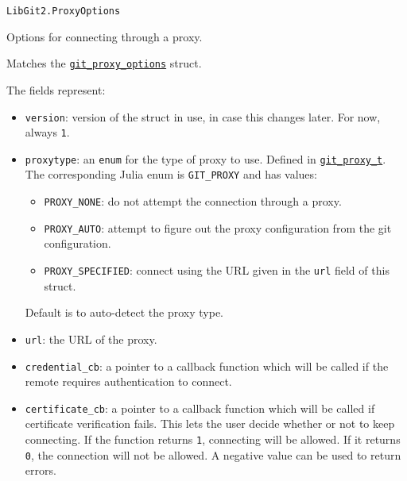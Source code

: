 \begin{adjustwidth}{2em}{0pt}


\begin{verbatim}
LibGit2.ProxyOptions
\end{verbatim}

Options for connecting through a proxy.

Matches the \href{https://libgit2.org/libgit2/\#HEAD/type/git\_proxy\_options}{\texttt{git\_proxy\_options}} struct.

The fields represent:

\begin{itemize}
\item \texttt{version}: version of the struct in use, in case this changes later. For now, always \texttt{1}.


\item \texttt{proxytype}: an \texttt{enum} for the type of proxy to use.  Defined in \href{https://libgit2.org/libgit2/\#HEAD/type/git\_proxy\_t}{\texttt{git\_proxy\_t}}.  The corresponding Julia enum is \texttt{GIT\_PROXY} and has values:

\begin{itemize}
\item \texttt{PROXY\_NONE}: do not attempt the connection through a proxy.


\item \texttt{PROXY\_AUTO}: attempt to figure out the proxy configuration from the git configuration.


\item \texttt{PROXY\_SPECIFIED}: connect using the URL given in the \texttt{url} field of this struct.

\end{itemize}
Default is to auto-detect the proxy type.


\item \texttt{url}: the URL of the proxy.


\item \texttt{credential\_cb}: a pointer to a callback function which will be called if the remote requires authentication to connect.


\item \texttt{certificate\_cb}: a pointer to a callback function which will be called if certificate verification fails. This lets the user decide whether or not to keep connecting. If the function returns \texttt{1}, connecting will be allowed. If it returns \texttt{0}, the connection will not be allowed. A negative value can be used to return errors.



\end{itemize}
\end{adjustwidth}
